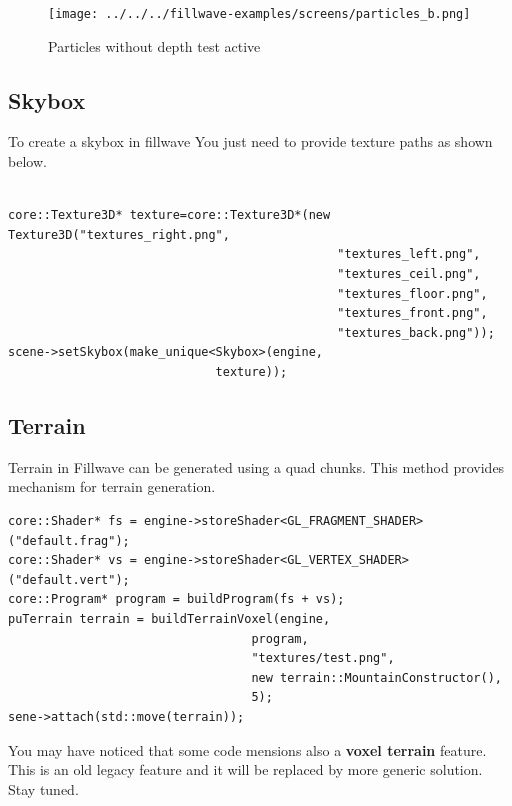 \documentclass{article}
\begin{document}
\begin{figure}
    \centering
    \texttt{[image: ../../../fillwave-examples/screens/particles\_b.png]}
    \caption{Particles without depth test active}
    \label{particle_no_depth_test}
\end{figure}

\newpage

\subsection{Skybox}\label{sec:Skybox}

\indent \indent To create a skybox in fillwave You just need to provide texture paths as shown below.

\begin{lstlisting}

core::Texture3D* texture=core::Texture3D*(new Texture3D("textures_right.png",
                                              "textures_left.png",
                                              "textures_ceil.png",
                                              "textures_floor.png",
                                              "textures_front.png",
                                              "textures_back.png"));
scene->setSkybox(make_unique<Skybox>(engine,
                             texture));
\end{lstlisting}

\subsection{Terrain}\label{sec:Terrain}
\indent \indent Terrain in Fillwave can be generated using a quad chunks. This method provides mechanism for terrain generation.


\begin{lstlisting}
core::Shader* fs = engine->storeShader<GL_FRAGMENT_SHADER>("default.frag");
core::Shader* vs = engine->storeShader<GL_VERTEX_SHADER>("default.vert");
core::Program* program = buildProgram(fs + vs);
puTerrain terrain = buildTerrainVoxel(engine,
                                  program,
                                  "textures/test.png",
                                  new terrain::MountainConstructor(),
                                  5);
sene->attach(std::move(terrain));
\end{lstlisting}

\indent You may have noticed that some code mensions also a \textbf{voxel terrain} feature. This is an old legacy feature and it will be replaced by more generic solution. Stay tuned.
\end{document}

